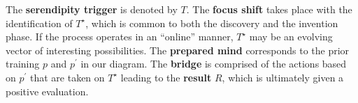 The \textbf{serendipity trigger} is denoted by $T$.
%
The \textbf{focus shift} takes place with the identification of
$T^\star$, which is common to both the discovery and the invention
phase.  If the process operates in an ``online'' manner, $T^\star$ may
be an evolving vector of interesting possibilities.
%
The \textbf{prepared mind} corresponds to the prior training $p$ and
$p^{\prime}$ in our diagram.
%
%
The \textbf{bridge} is comprised of the actions based on $p^{\prime}$
that are taken on $T^\star$ leading to the \textbf{result} $R$, which is ultimately given a positive evaluation.

